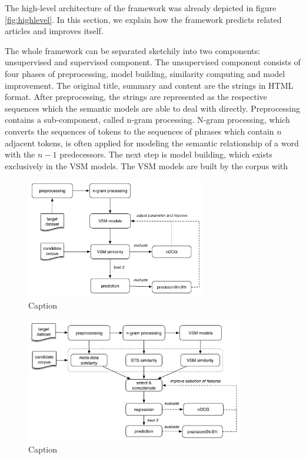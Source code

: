 The high-level architecture of the framework was already depicted in figure \ref{fig:highlevel}. In this section, we explain how the framework predicts related articles and improves itself. 

The whole framework can be separated sketchily into two components: unsupervised and supervised component. The unsupervised component consists of four phases of preprocessing, model building, similarity computing and model improvement. The original title, summary and content are the strings in HTML format. After preprocessing, the strings are represented as the respective sequences which the semantic models are able to deal with directly. Preprocessing contains a sub-component, called n-gram processing. N-gram processing, which converts the sequences of tokens to the sequences of phrases which contain $n$ adjacent tokens, is often applied for modeling the semantic relationship of a word with the $n-1$ predecessors. The next step is model building, which exists exclusively in the VSM models. The VSM models are built by the corpus with 

\begin{figure}[!htb]
    \centering
    \includegraphics[width=0.7\textwidth]{fig/unsupervised}
    \caption{Caption}
    \label{fig:unsupervised}
\end{figure}

\begin{figure}[!htb]
    \centering
    \includegraphics[width=0.85\textwidth]{fig/supervised}
    \caption{Caption}
    \label{fig:supervised}
\end{figure}

